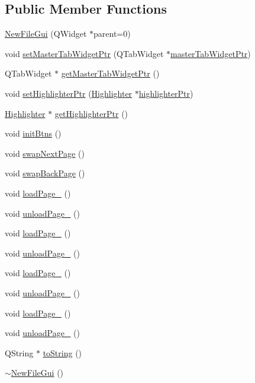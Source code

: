 \subsection*{Public Member Functions}
\begin{DoxyCompactItemize}
\item 
\hyperlink{class_new_file_gui_a090f156ef13c1915fe96cd47f6ff049d}{New\-File\-Gui} (Q\-Widget $\ast$parent=0)
\item 
void \hyperlink{class_new_file_gui_ad4a8eb0dc938398749073e636bd7fc3f}{set\-Master\-Tab\-Widget\-Ptr} (Q\-Tab\-Widget $\ast$\hyperlink{class_new_file_gui_a9a3baa00763c6d8d90e7e39ea3f1585c}{master\-Tab\-Widget\-Ptr})
\item 
Q\-Tab\-Widget $\ast$ \hyperlink{class_new_file_gui_a650227edbbc789784a56b2f990697abb}{get\-Master\-Tab\-Widget\-Ptr} ()
\item 
void \hyperlink{class_new_file_gui_ac35f4e742681ccc0d52d083899b4bc85}{set\-Highlighter\-Ptr} (\hyperlink{class_highlighter}{Highlighter} $\ast$\hyperlink{class_new_file_gui_a4a63ed16985eeb14fbe35e3197420873}{highlighter\-Ptr})
\item 
\hyperlink{class_highlighter}{Highlighter} $\ast$ \hyperlink{class_new_file_gui_a51fe16ba94f7089b4b5961d30053e1f7}{get\-Highlighter\-Ptr} ()
\item 
void \hyperlink{class_new_file_gui_ad77edffa59956f16ef2b6d83dd357932}{init\-Btns} ()
\item 
void \hyperlink{class_new_file_gui_a3789c0137a7a1e6d3b9a09ebf97657c5}{swap\-Next\-Page} ()
\item 
void \hyperlink{class_new_file_gui_a19b6c2a372c842aa72b244b11fe458e7}{swap\-Back\-Page} ()
\item 
void \hyperlink{class_new_file_gui_ae279a6aa9f6e065254f02595491870bf}{load\-Page\-\_} ()
\item 
void \hyperlink{class_new_file_gui_ac5098fcfded5a9fca609eef19a777a46}{unload\-Page\-\_} ()
\item 
void \hyperlink{class_new_file_gui_a734dbe5493abf2d090b331c9b5d3ea39}{load\-Page\-\_} ()
\item 
void \hyperlink{class_new_file_gui_a38230b8cf285f610595f9e762be4a3ba}{unload\-Page\-\_} ()
\item 
void \hyperlink{class_new_file_gui_a7f61834fa8074aeefebfcb8600bba8cd}{load\-Page\-\_} ()
\item 
void \hyperlink{class_new_file_gui_a7ef65bd194d94091ff27648f765023b6}{unload\-Page\-\_} ()
\item 
void \hyperlink{class_new_file_gui_ad60fb0b561d16f76062af7e17732d318}{load\-Page\-\_} ()
\item 
void \hyperlink{class_new_file_gui_a7f604bc4692d3ebd66d00544fb1eb2de}{unload\-Page\-\_} ()
\item 
Q\-String $\ast$ \hyperlink{class_new_file_gui_a521fe1c6fd4fbbbe2b28050e77f772a1}{to\-String} ()
\item 
\hyperlink{class_new_file_gui_aaaa64713298564b96e77a199a911c27b}{$\sim$\-New\-File\-Gui} ()
\end{DoxyCompactItemize}
